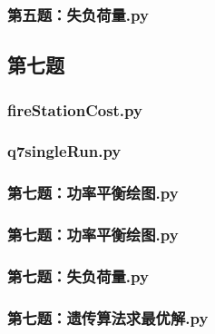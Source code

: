 \documentclass{cumcmthesis}
\begin{document}
\begin{appendices}
	\subsubsection{第五题：失负荷量.py}
	
	
	\subsection{第七题}
	\subsubsection{fireStationCost.py}
		
	\subsubsection{q7singleRun.py}
		
	\subsubsection{第七题：功率平衡绘图.py}
	
		\subsubsection{第七题：功率平衡绘图.py}
	
		\subsubsection{第七题：失负荷量.py}
	
	\subsubsection{第七题：遗传算法求最优解.py}
		
\end{appendices}
\end{document}
